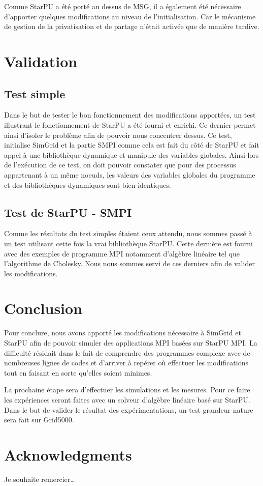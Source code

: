 \documentclass[smallextended]{svjour3}
\begin{document}
Comme StarPU a été porté au dessus de MSG, il a également été
nécessaire d'apporter quelques modifications au niveau de
l'initialisation. Car le mécanisme de gestion de la privatisation et
de partage n'était activée que de manière tardive. 

\section{Validation}
\label{sec-6}
\subsection{Test simple}
\label{sec-6-1}
Dans le but de tester le bon fonctionnement des modifications
apportées, un test illustrant le fonctionnement de StarPU a été
fourni et enrichi. Ce dernier permet ainsi d'isoler le problème
afin de pouvoir nous concentrer dessus. Ce test, initialise SimGrid
et la partie SMPI comme cela est fait du côté de StarPU et fait
appel à une bibliothèque dynamique et manipule des variables
globales. Ainsi lors de l'exécution de ce test, on doit pouvoir
constater que pour des processus appartenant à un même noeuds, les
valeurs des variables globales du programme et des bibliothèques
dynamiques sont bien identiques.  
\subsection{Test de StarPU - SMPI}
\label{sec-6-2}
Comme les résultats du test simples étaient ceux attendu, nous
sommes passé à un test utilisant cette fois la vrai bibliothèque
StarPU. Cette dernière est fourni avec des exemples de programme MPI
notamment d'algèbre linéaire tel que l'algorithme de Cholesky. Nous
nous sommes servi de ces derniers afin de valider les
modifications. 
\section{Conclusion}
\label{sec-7}
Pour conclure, nous avons apporté les modifications nécessaire à 
SimGrid et StarPU afin de pouvoir simuler des applications MPI basées 
sur StarPU MPI. La difficulté résidait dans le fait de comprendre des 
programmes complexe avec de nombreuses lignes de codes et d'arriver 
à repérer où effectuer les modifications tout en faisant en sorte 
qu'elles soient minimes.

La prochaine étape sera d'effectuer les simulations et les mesures. 
Pour ce faire les expériences seront faites avec un solveur d'algèbre 
linéaire basé sur StarPU. Dans le but de valider le résultat des 
expérimentations, un test grandeur nature sera fait sur Grid5000.  

\section*{Acknowledgments}
Je souhaite remercier\ldots{}

\nocite{*}
\def\raggedright{}


\end{document}
